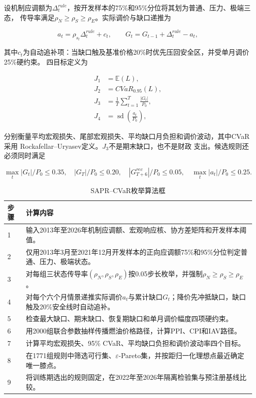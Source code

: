设机制应调额为$\Delta_t^{rule}$，按开发样本的75\%和95\%分位将其划为普通、压力、极端三态，
传导率满足$\rho_N\ge\rho_S\ge\rho_E$。实际调价与缺口递推为

\begin{equation}
  a_t=\rho_{s_t}\Delta_t^{rule}+c_t,\qquad
  G_t=G_{t-1}+\Delta_t^{rule}-a_t,
  \label{eq:sapr-gap}
\end{equation}

其中$c_t$为自动追补项：当缺口触及基准价格20\%时优先压回安全区，并受单月调价25\%硬约束。
四目标定义为

\begin{equation}
\begin{aligned}
J_1&=\mathbb E(L),\\
J_2&=CVaR_{0.95}(L),\\
J_3&=\frac{1}{T}\sum_{t=1}^{T}\frac{|G_t|}{P_0},\\
J_4&=\operatorname{sd}\!\left(\frac{a_t}{P_0}\right),
\end{aligned}
\label{eq:sapr-objectives}
\end{equation}

分别衡量平均宏观损失、尾部宏观损失、平均缺口月负担和调价波动，其中CVaR采用
Rockafellar--Uryasev定义\cite{rockafellar2000}。$J_3$不是期末缺口，也不是财政
支出。候选规则还必须同时满足

\begin{equation}
  \max_t|G_t|/P_0\le0.35,\quad |G_T|/P_0\le0.20,\quad
  |G_{T+6}^{rec}|/P_0\le0.05,\quad \max_t|a_t|/P_0\le0.25.
  \label{eq:sapr-constraints}
\end{equation}

\begin{table}[htbp]
  \centering
  \small
  \caption{SAPR--CVaR枚举算法框}
  \label{tab:q4-algorithm}
  \begin{tabularx}{0.98\textwidth}{p{}X}
    \toprule
    步骤 & 计算内容 \\
    \midrule
    1 & 输入2013年至2026年机制应调额、宏观响应核、协方差矩阵和开发样本阈值。 \\
    2 & 仅用2013年3月至2021年12月开发样本的正向应调额75\%和95\%分位判定普通、压力、极端状态。 \\
    3 & 对每组三状态传导率$(\rho_N,\rho_S,\rho_E)$按0.05步长枚举，并强制$\rho_N\ge\rho_S\ge\rho_E$。 \\
    4 & 对每个六个月情景递推实际调价$a_t$与累计缺口$G_t$；降价先冲抵缺口，缺口触及20\%安全线时自动追补。 \\
    5 & 检查最大缺口、期末缺口、恢复期缺口和单月调价幅度四项硬约束。 \\
    6 & 用2000组联合参数抽样传播燃油价格路径，计算PPI、CPI和IAV路径。 \\
    7 & 计算平均宏观损失、95\% CVaR、平均缺口负担和调价波动率四个目标。 \\
    8 & 在1771组规则中筛选可行集、$\varepsilon$-Pareto集，并按距归一化理想点最近确定唯一膝点。 \\
    9 & 将训练期选出的规则固定，在2022年至2026年隔离检验集与预注册基线比较。 \\
    \bottomrule
  \end{tabularx}
\end{table}

